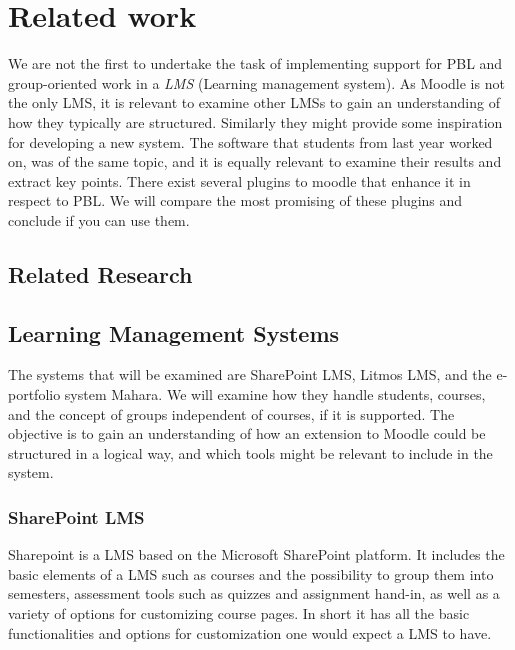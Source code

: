 \section{Related work}
We are not the first to undertake the task of implementing support for PBL and group-oriented work in a \textit{LMS} (Learning management system). 
As Moodle is not the only LMS, it is relevant to examine other LMSs to gain an understanding of how they typically are structured. 
Similarly they might provide some inspiration for developing a new system.
The software that students from last year worked on, was of the same topic, and it is equally relevant to examine their results and extract key points.
There exist several plugins to moodle that enhance it in respect to PBL. We will compare the most promising of these plugins and conclude if you can use them.

\subsection{Related Research}


\subsection{Learning Management Systems}
The systems that will be examined are SharePoint LMS, Litmos LMS, and the e-portfolio system Mahara.
We will examine how they handle students, courses, and the concept of groups independent of courses, if it is supported.
The objective is to gain an understanding of how an extension to Moodle could be structured in a logical way, and which tools might be relevant to include in the system.

\subsubsection{SharePoint LMS} 
Sharepoint \citep{sharepoint1,sharepoint2} is a LMS based on the Microsoft SharePoint platform. 
It includes the basic elements of a LMS such as courses and the possibility to group them into semesters, assessment tools such as quizzes and assignment hand-in, as well as a variety of options for customizing course pages.
In short it has all the basic functionalities and options for customization one would expect a LMS to have.

